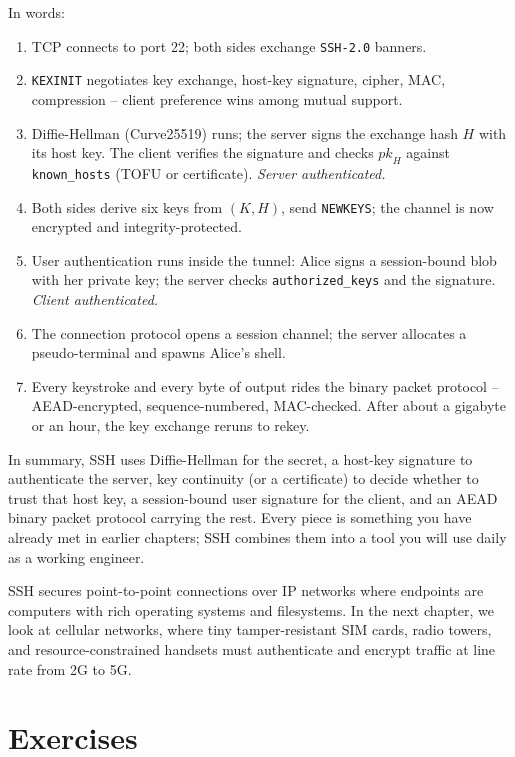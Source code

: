 In words:

\begin{enumerate}
  \item TCP connects to port 22; both sides exchange \texttt{SSH-2.0} banners.
  \item \texttt{KEXINIT} negotiates key exchange, host-key signature, cipher, MAC, compression -- client preference wins among mutual support.
  \item Diffie-Hellman (Curve25519) runs; the server signs the exchange hash $H$ with its host key. The client verifies the signature and checks $\textit{pk}_H$ against \texttt{known\_hosts} (TOFU or certificate). \emph{Server authenticated.}
  \item Both sides derive six keys from $(K,H)$, send \texttt{NEWKEYS}; the channel is now encrypted and integrity-protected.
  \item User authentication runs inside the tunnel: Alice signs a session-bound blob with her private key; the server checks \texttt{authorized\_keys} and the signature. \emph{Client authenticated.}
  \item The connection protocol opens a session channel; the server allocates a pseudo-terminal and spawns Alice's shell.
  \item Every keystroke and every byte of output rides the binary packet protocol -- AEAD-encrypted, sequence-numbered, MAC-checked. After about a gigabyte or an hour, the key exchange reruns to rekey.
\end{enumerate}

In summary, SSH uses Diffie-Hellman for the secret, a host-key signature to authenticate the server, key continuity (or a certificate) to decide whether to trust that host key, a session-bound user signature for the client, and an AEAD binary packet protocol carrying the rest. Every piece is something you have already met in earlier chapters; SSH combines them into a tool you will use daily as a working engineer.

SSH secures point-to-point connections over IP networks where endpoints are computers with rich operating systems and filesystems. In the next chapter, we look at cellular networks, where tiny tamper-resistant SIM cards, radio towers, and resource-constrained handsets must authenticate and encrypt traffic at line rate from 2G to 5G.

\section{Exercises}

